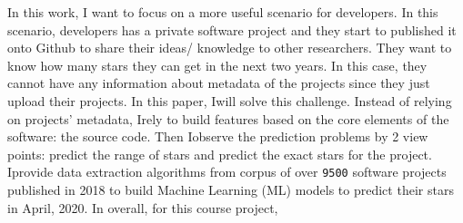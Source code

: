 In this work, I want to focus on a more useful scenario for developers. In this scenario, developers has a private software project and they start to published it onto Github to share their ideas/ knowledge to other researchers. They want to know how many stars they can get in the next two years. In this case, they cannot have any information about metadata of the projects since they just upload their projects. In this paper, Iwill solve this challenge. Instead of relying on projects' metadata, Irely to build features based on the core elements of the software: the source code. Then Iobserve the prediction problems by 2 view points: predict the range of stars and predict the exact stars for the project. Iprovide data extraction algorithms from corpus of over \texttt{9500} software projects published in 2018 to build Machine Learning (ML) models to predict their stars in April, 2020. In overall, for this course project,  


